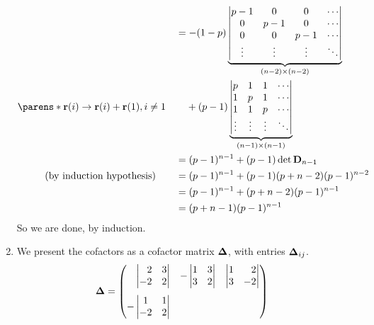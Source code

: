 \documentclass[fleqn,a4paper,11pt]{article}
\begin{document}
\begin{enumerate}[label=\textbf{\arabic*.}]
\begin{alignat*}
    && &= -(1 - p)\underbrace{\begin{vmatrix}
     p - 1 & 0 & 0 & \cdots \\
     0 & p - 1 & 0 & \cdots \\
     0 & 0 & p - 1 & \cdots \\
     \vdots & \vdots & \vdots & \ddots \\
    \end{vmatrix}}_{(n - 2) \times (n - 2)} \\
    \parens*{
     \vec r(i) \to \vec r(i) + \vec r(1), i \ne 1
    }
    && &\phantom{={}} + (p - 1)\underbrace{\begin{vmatrix}
     p & 1 & 1 & \cdots \\
     1 & p & 1 & \cdots \\
     1 & 1 & p & \cdots \\
     \vdots & \vdots & \vdots & \ddots
    \end{vmatrix}}_{(n - 1) \times (n - 1)} \\
    && &= (p - 1)^{n - 1} + (p - 1)\det \mat D_{n - 1} \\
    (\text{by induction hypothesis})\quad
    && &= (p - 1)^{n - 1} + (p - 1) (p + n - 2)(p - 1)^{n - 2} \\
    && &= (p - 1)^{n - 1} + (p + n - 2)(p - 1)^{n - 1} \\
    && &= (p + n - 1)(p - 1)^{n - 1}
   \end{alignat*}
   So we are done, by induction.
  \item
   We present the cofactors as a cofactor matrix \(\mathbf{\Delta}\), with entries
   \(\mathbf{\Delta}_{ij}\).
   \begin{align*}
    \mat \Delta
    &= \begin{pmatrix*}[r]
     \begin{vmatrix*}[r]
      2 & 3 \\
      -2 & 2
     \end{vmatrix*} &
     -\begin{vmatrix}
      1 & 3 \\
      3 & 2
     \end{vmatrix} &
     \begin{vmatrix*}[r]
      1 & 2 \\
      3 & -2
     \end{vmatrix*} \\[3ex]
     -\begin{vmatrix}
      1 & 1 \\
      -2 & 2
     \end{vmatrix} &

\end{pmatrix*}
\end{align*}
\end{enumerate}
\end{document}
